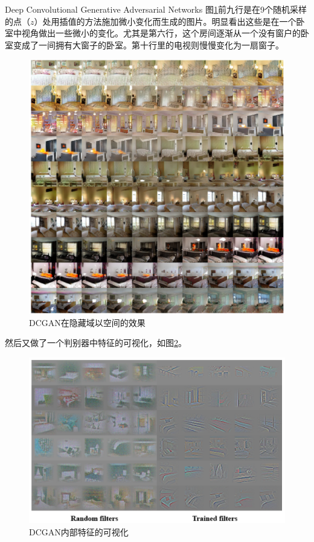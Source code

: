 \documentclass{ctexart}
\begin{document}
\begin{section}{Deep Convolutional Generative Adversarial Networks}
		图\ref{fig:dcgan-visual-internals-latent}前九行是在9个随机采样的点（$z$）处用插值的方法施加微小变化而生成的图片。明显看出这些是在一个卧室中视角做出一些微小的变化。尤其是第六行，这个房间逐渐从一个没有窗户的卧室变成了一间拥有大窗子的卧室。第十行里的电视则慢慢变化为一扇窗子。
		
		\begin{figure}
			\centering
			\includegraphics[width=40em]{figures/DCGAN-visualizing-internals-walking-in-latent.png}
			\caption{DCGAN在隐藏域以空间的效果}
			\label{fig:dcgan-visual-internals-latent}
		\end{figure}
		
		然后又做了一个判别器中特征的可视化，如图\ref{fig:dcgan-visual-internals-filters}。
		
		\begin{figure}
			\centering
			\includegraphics[width=40em]{figures/DCGAN-visualizing-internals-filters.png}
			\caption{DCGAN内部特征的可视化}
			\label{fig:dcgan-visual-internals-filters}
		\end{figure}
		

\end{section}
\end{document}
